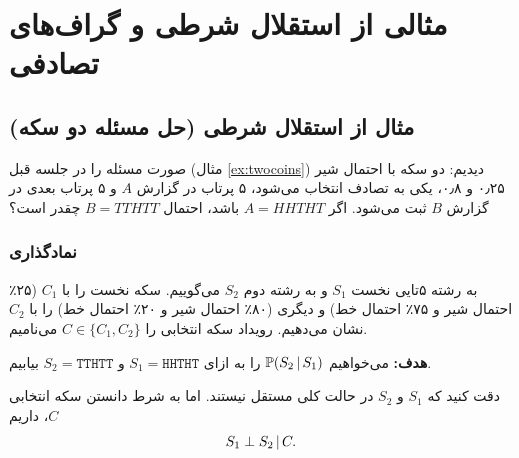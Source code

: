 \chapter{مثالی از استقلال شرطی و گراف‌های تصادفی}

\section{مثال از استقلال شرطی (حل مسئله دو سکه)}

صورت مسئله را در جلسه قبل (مثال \ref{ex:twocoins}) دیدیم: دو سکه با احتمال شیر ۰٫۲۵ و ۰٫۸، یکی به تصادف انتخاب می‌شود، ۵ پرتاب در گزارش $A$ و ۵ پرتاب بعدی در گزارش $B$ ثبت می‌شود. اگر $A=HHTHT$ باشد، احتمال $B=TTHTT$ چقدر است؟

\subsection*{نمادگذاری }
به رشته ۵تایی نخست $S_1$ و به رشته دوم $S_2$ می‌گوییم. سکه نخست را با $C_1$ (۲۵٪ احتمال شیر و ۷۵٪ احتمال خط) و دیگری (۸۰٪ احتمال شیر و ۲۰٪ احتمال خط) را با $C_2$ نشان می‌دهیم. رویداد سکه انتخابی را $C\in\{C_1,C_2\}$ می‌نامیم.

\textbf{هدف:} می‌خواهیم $\mathbb{P}(S_2\,|\, S_1)$ را به ازای $S_1=\mathtt{HHTHT}$ و $S_2=\mathtt{TTHTT}$ بیابیم.

دقت کنید که $S_1$ و $S_2$ در حالت کلی مستقل نیستند. اما به شرط دانستن سکه انتخابی $C$، داریم
\[
S_1\perp S_2\,|\, C .
\]

\begin{center}
\end{center}

